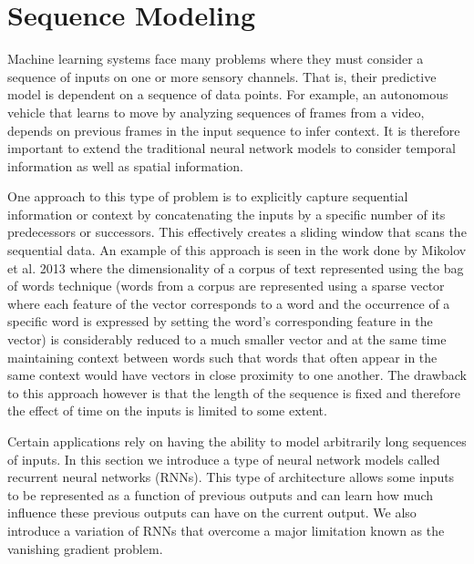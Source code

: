 \section{Sequence Modeling} \label{sec:background-sequence-modeling} 

Machine learning systems face many problems where they must consider a sequence of inputs on one or more sensory channels. That is, their predictive model is dependent on a sequence of data points. For example, an autonomous vehicle that learns to move by analyzing sequences of frames from a video, depends on previous frames in the input sequence to infer context. It is therefore important to extend the traditional neural network models to consider temporal information as well as spatial information\cite{DBLP:journals/corr/Lipton15}.

One approach to this type of problem is to explicitly capture sequential information or context by concatenating the inputs by a specific number of its predecessors or successors. This effectively creates a sliding window that scans the sequential data\cite{DBLP:journals/corr/Lipton15}. An example of this approach is seen in the work done by Mikolov et al. 2013 where the dimensionality of a corpus of text represented using the bag of words technique (words from a corpus are represented using a sparse vector where each feature of the vector corresponds to a word and the occurrence of a specific word is expressed by setting the word's corresponding feature in the vector) is considerably reduced to a much smaller vector and at the same time maintaining context between words such that words that often appear in the same context would have vectors in close proximity to one another\cite{DBLP:journals/corr/abs-1301-3781}. The drawback to this approach however is that the length of the sequence is fixed and therefore the effect of time on the inputs is limited to some extent.

Certain applications rely on having the ability to model arbitrarily long sequences of inputs. In this section we introduce a type of neural network models called recurrent neural networks (RNNs). This type of architecture allows some inputs to be represented as a function of previous outputs and can learn how much influence these previous outputs can have on the current output\cite{DBLP:journals/corr/Lipton15}. We also introduce a variation of RNNs that overcome a major limitation known as the vanishing gradient problem.



